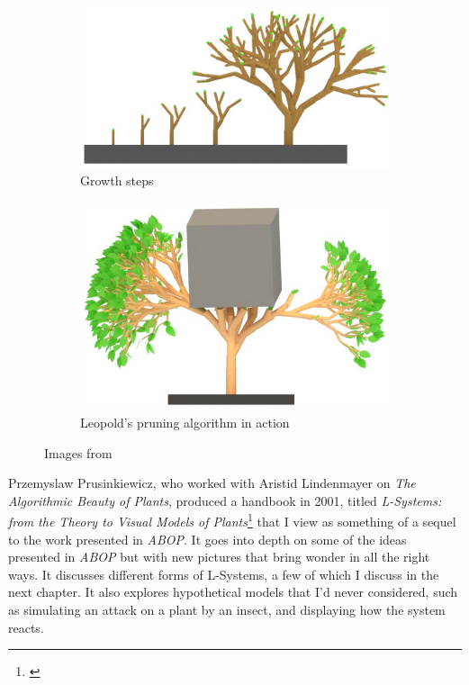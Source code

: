 \documentclass[12pt,twoside]{reedthesis}
\begin{document}
	\begin{figure}[h]
	\centering
	\begin{subfigure}{0.5\linewidth}
		\centering
		\includegraphics[width=\linewidth]{Images/Leopold3}
		\caption{Growth steps}
		\label {Growth}
	\end{subfigure}%
	\hfill
	\begin{subfigure}{0.5\linewidth}
		\centering
		\includegraphics[width=\linewidth]{Images/Leopold2}
		\caption{Leopold's pruning algorithm in action}
		\label {Pruning}
	\end{subfigure}
	\caption{Images from \cite{Leopold2017}}
	\label{LeopoldTrees}
	\end{figure}
	
	Przemyslaw Prusinkiewicz, who worked with Aristid Lindenmayer on \textit{The Algorithmic Beauty of Plants}, produced a handbook in 2001, titled \textit{L-Systems: from the Theory to Visual Models of Plants}\footnote{\cite{LSystems2001}} that I view as something of a sequel to the work presented in \textit{ABOP}. It goes into depth on some of the ideas presented in \textit{ABOP} but with new pictures that bring wonder in all the right ways. It discusses different forms of L-Systems, a few of which I discuss in the next chapter. It also explores hypothetical models that I'd never considered, such as simulating an attack on a plant by an insect, and displaying how the system reacts.
	
\end{document}
